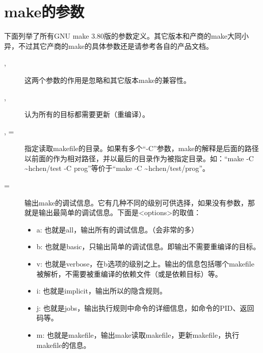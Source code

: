 \documentclass[a4paper,10pt]{sphinxmanual}
\begin{document}
\section{make的参数}
\label{\detokenize{invoke:id4}}
下面列举了所有GNU make 3.80版的参数定义。其它版本和产商的make大同小异，不过其它产商的make的具体参数还是请参考各自的产品文档。
\begin{description}
\item[{, }] \leavevmode
这两个参数的作用是忽略和其它版本make的兼容性。

\item[{, }] \leavevmode
认为所有的目标都需要更新（重编译）。

\item[{ , =}] \leavevmode
指定读取makefile的目录。如果有多个“-C”参数，make的解释是后面的路径以前面的作为相对路径，并以最后的目录作为被指定目录。如：“make -C \textasciitilde{}hchen/test -C prog”等价于“make -C \textasciitilde{}hchen/test/prog”。

\item[{\sphinxcode{\sphinxupquote{-debug}}{[}=\sphinxstyleemphasis{\textless{}options\textgreater{}}{]}}] \leavevmode
输出make的调试信息。它有几种不同的级别可供选择，如果没有参数，那就是输出最简单的调试信息。下面是\textless{}options\textgreater{}的取值：
\begin{itemize}
\item {} 
a: 也就是all，输出所有的调试信息。（会非常的多）

\item {} 
b: 也就是basic，只输出简单的调试信息。即输出不需要重编译的目标。

\item {} 
v: 也就是verbose，在b选项的级别之上。输出的信息包括哪个makefile被解析，不需要被重编译的依赖文件（或是依赖目标）等。

\item {} 
i: 也就是implicit，输出所以的隐含规则。

\item {} 
j: 也就是jobs，输出执行规则中命令的详细信息，如命令的PID、返回码等。

\item {} 
m: 也就是makefile，输出make读取makefile，更新makefile，执行makefile的信息。


\end{itemize}
\end{description}
\end{document}
